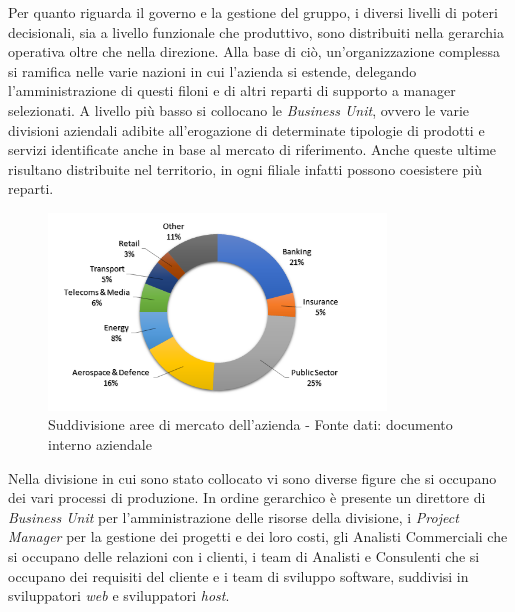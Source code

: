 	Per quanto riguarda il governo e la gestione del gruppo, i diversi livelli di poteri decisionali, sia a livello funzionale che produttivo, sono distribuiti nella gerarchia operativa oltre che nella direzione. Alla base di ciò, un'organizzazione complessa si ramifica nelle varie nazioni in cui l'azienda si estende, delegando l'amministrazione di questi filoni e di altri reparti di supporto a manager selezionati. A livello più basso si collocano le \textit{Business Unit}, ovvero le varie divisioni aziendali adibite all'erogazione di determinate tipologie di prodotti e servizi identificate anche in base al mercato di riferimento. Anche queste ultime risultano distribuite nel territorio, in ogni filiale infatti possono coesistere più reparti.\\
	
	\begin{figure}[H]
	\centering
	   	\includegraphics[width=0.8\textwidth]{immagini/Mercati_Principali}
	   	\caption{Suddivisione aree di mercato dell'azienda - Fonte dati: documento interno aziendale}
	\end{figure}
	
	Nella divisione in cui sono stato collocato vi sono diverse figure che si occupano dei vari processi di produzione. In ordine gerarchico è presente un direttore di \textit{Business Unit} per l'amministrazione delle risorse della divisione, i \textit{Project Manager} per la gestione dei progetti e dei loro costi, gli Analisti Commerciali che si occupano delle relazioni con i clienti, i team di Analisti e Consulenti che si occupano dei requisiti del cliente e i team di sviluppo software, suddivisi in sviluppatori \textit{web} e sviluppatori \textit{host}.\\

